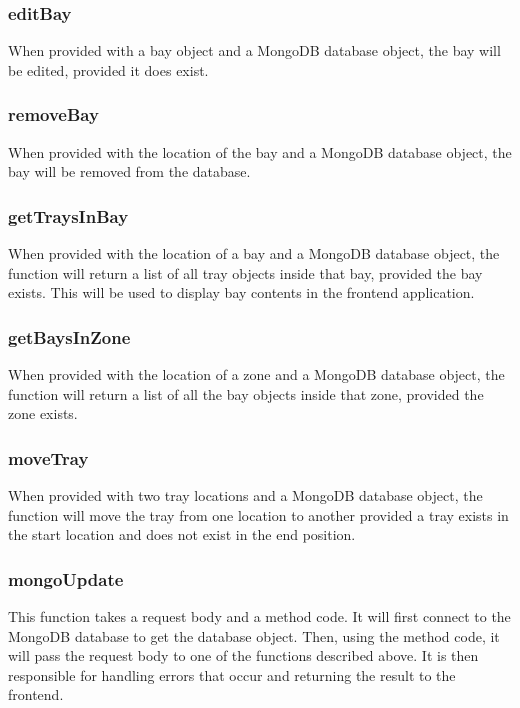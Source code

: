 \documentclass[letterpaper,10pt,english]{sphinxmanual}
\begin{document}
\subsubsection{editBay}
\label{\detokenize{docs/System_Overview/Backend_overview:editbay}}
When provided with a bay object and a MongoDB database object, the bay
will be edited, provided it does exist.


\subsubsection{removeBay}
\label{\detokenize{docs/System_Overview/Backend_overview:removebay}}
When provided with the location of the bay and a MongoDB database
object, the bay will be removed from the database.


\subsubsection{getTraysInBay}
\label{\detokenize{docs/System_Overview/Backend_overview:gettraysinbay}}
When provided with the location of a bay and a MongoDB database object,
the function will return a list of all tray objects inside that bay,
provided the bay exists. This will be used to display bay contents in
the front\sphinxhyphen{}end application.


\subsubsection{getBaysInZone}
\label{\detokenize{docs/System_Overview/Backend_overview:getbaysinzone}}
When provided with the location of a zone and a MongoDB database object,
the function will return a list of all the bay objects inside that zone,
provided the zone exists.


\subsubsection{moveTray}
\label{\detokenize{docs/System_Overview/Backend_overview:movetray}}
When provided with two tray locations and a MongoDB database object, the
function will move the tray from one location to another provided a tray
exists in the start location and does not exist in the end position.


\subsubsection{mongoUpdate}
\label{\detokenize{docs/System_Overview/Backend_overview:mongoupdate}}
This function takes a request body and a method code. It will first
connect to the MongoDB database to get the database object. Then, using
the method code, it will pass the request body to one of the functions
described above. It is then responsible for handling errors that occur
and returning the result to the front\sphinxhyphen{}end.
\end{document}
